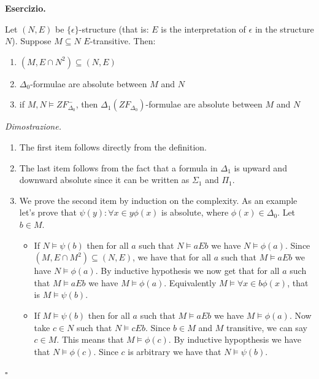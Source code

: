 \documentclass[a4paper,12pt]{article}
\newenvironment{exercise}
  {\par\vspace{1em}\noindent\textbf{Esercizio.} }
  {\par\vspace{1em}}
\newenvironment{proof}
  {\par\vspace{0.5em}\noindent\textit{Dimostrazione.} }
  {\par\vspace{1em}\hfill$\square$}
\begin{document}
\begin{exercise}

	Let $(N,E)$ be $\{ \epsilon \}$-structure (that is: $E$ is the interpretation of $\epsilon$ in the structure $N$). Suppose $M \subseteq N$ $E$-transitive. Then:
	\begin{enumerate}
		\item	$(M,E \cap N^2) \subseteq (N,E)$
		\item	$\Delta_0$-formulae are absolute between $M$ and $N$
		\item	if $M,N \models ZF^{-}_{\Delta_0}$, then $\Delta_1(ZF_{\Delta_0})$-formulae are absolute between $M$ and $N$
	\end{enumerate}

\end{exercise}

\begin{proof}

	\begin{enumerate}
		\item The first item follows directly from the definition.
		\item The last item follows from the fact that a formula in $\Delta_1$ is upward and downward absolute since it can be written as $\Sigma_1$ and $\Pi_1$.
		\item We prove the second item by induction on the complexity. As an example let's prove that $\psi(y): \forall x \in y \phi(x) $ is absolute, where $\phi(x) \in \Delta_0$.
			Let $b \in M$. 
			\begin{itemize}
				\item	If $N \models \psi(b)$ then for all $a$ such that $N \models a E b$ we have $N \models \phi(a)$.
					Since $(M, E \cap M^2) \subseteq (N,E)$, we have that for all $a$ such that $M \models a E b$ we have $N \models \phi(a)$.
					By inductive hypothesis we now get that for all $a$ such that $M \models a E b$ we have $M \models \phi(a)$.
					Equivalently $M \models \forall x \in b \phi(x)$, that is $M \models \psi(b)$.

				\item	If $M \models \psi(b)$ then for all $a$ such that $M \models a E b$ we have $M \models \phi(a)$.
					Now take $c \in N$ such that $N \models c E b$. Since $b \in M$ and $M$ transitive, we can say $c \in M$.
					This means that $M \models \phi(c)$. By inductive hypopthesis we have that $N \models \phi(c)$.
					Since $c$ is arbitrary we have that $N \models \psi(b)$.
			\end{itemize}

	\end{enumerate}

\end{proof}
\end{document}
